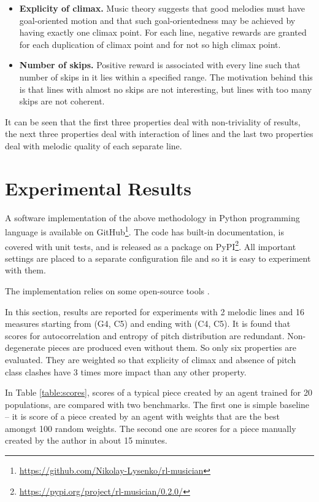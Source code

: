 \documentclass{article}
\begin{document}
\begin{itemize}
    \item \textbf{Explicity of climax.} Music theory suggests that good melodies must have goal-oriented motion and that such goal-orientedness may be achieved by having exactly one climax point. For each line, negative rewards are granted for each duplication of climax point and for not so high climax point.
    \item \textbf{Number of skips.} Positive reward is associated with every line such that number of skips in it lies within a specified range. The motivation behind this is that lines with almost no skips are not interesting, but lines with too many skips are not coherent.
\end{itemize}

It can be seen that the first three properties deal with non-triviality of results, the next three properties deal with interaction of lines and the last two properties deal with melodic quality of each separate line. 


\section{Experimental Results}
\label{sec:results}

A software implementation of the above methodology in Python programming language is available on GitHub\footnote{\url{https://github.com/Nikolay-Lysenko/rl-musician}}. The code has built-in documentation, is covered with unit tests, and is released as a package on PyPI\footnote{\url{https://pypi.org/project/rl-musician/0.2.0/}}. All important settings are placed to a separate configuration file and so it is easy to experiment with them.

The implementation relies on some open-source tools \cite{brockman2016openai,oliphant2006guide,raffel2014intuitive}.

In this section, results are reported for experiments with 2 melodic lines and 16 measures starting from (G4, C5) and ending with (C4, C5). It is found that scores for autocorrelation and entropy of pitch distribution are redundant. Non-degenerate pieces are produced even without them. So only six properties are evaluated. They are weighted so that explicity of climax and absence of pitch class clashes have 3 times more impact than any other property.

In Table \ref{table:scores}, scores of a typical piece created by an agent trained for 20 populations, are compared with two benchmarks. The first one is simple baseline -- it is score of a piece created by an agent with weights that are the best amongst 100 random weights. The second one are scores for a piece manually created by the author in about 15 minutes.
\end{document}
